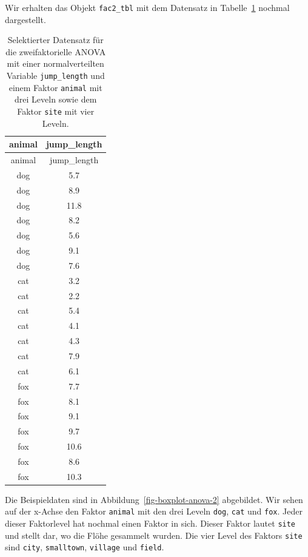 \documentclass[
  letterpaper,
  DIV=11,
  oneside]{scrreport}
\begin{document}
Wir erhalten das Objekt \texttt{fac2\_tbl} mit dem Datensatz in
Tabelle~\ref{tbl-data-anova-2} nochmal dargestellt.

\hypertarget{tbl-data-anova-2}{}
\begin{longtable}[]{@{}cc@{}}
\caption{\label{tbl-data-anova-2}Selektierter Datensatz für die
zweifaktorielle ANOVA mit einer normalverteilten Variable
\texttt{jump\_length} und einem Faktor \texttt{animal} mit drei Leveln
sowie dem Faktor \texttt{site} mit vier Leveln.}\tabularnewline
\toprule()
animal & jump\_length \\
\midrule()
\endfirsthead
\toprule()
animal & jump\_length \\
\midrule()
\endhead
dog & 5.7 \\
dog & 8.9 \\
dog & 11.8 \\
dog & 8.2 \\
dog & 5.6 \\
dog & 9.1 \\
dog & 7.6 \\
cat & 3.2 \\
cat & 2.2 \\
cat & 5.4 \\
cat & 4.1 \\
cat & 4.3 \\
cat & 7.9 \\
cat & 6.1 \\
fox & 7.7 \\
fox & 8.1 \\
fox & 9.1 \\
fox & 9.7 \\
fox & 10.6 \\
fox & 8.6 \\
fox & 10.3 \\
\bottomrule()
\end{longtable}

Die Beispieldaten sind in Abbildung~\ref{fig-boxplot-anova-2}
abgebildet. Wir sehen auf der x-Achse den Faktor \texttt{animal} mit den
drei Leveln \texttt{dog}, \texttt{cat} und \texttt{fox}. Jeder dieser
Faktorlevel hat nochmal einen Faktor in sich. Dieser Faktor lautet
\texttt{site} und stellt dar, wo die Flöhe gesammelt wurden. Die vier
Level des Faktors \texttt{site} sind \texttt{city}, \texttt{smalltown},
\texttt{village} und \texttt{field}.
\end{document}
